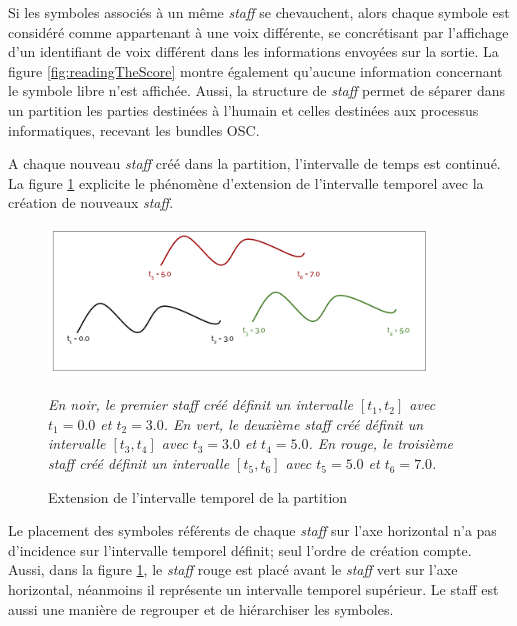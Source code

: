 Si les symboles associés à un même \textit{staff} se chevauchent, alors chaque symbole est considéré comme appartenant à une voix différente, se concrétisant par l'affichage d'un identifiant de voix différent dans les informations envoyées sur la sortie. La figure \ref{fig:readingTheScore} montre également qu'aucune information concernant le symbole libre n'est affichée. Aussi, la structure de \textit{staff} permet de séparer dans un partition les parties destinées à l'humain et celles destinées aux processus informatiques, recevant les bundles OSC.

A chaque nouveau \textit{staff} créé dans la partition, l'intervalle de temps est continué. La figure \ref{fig:stavesCreation} explicite le phénomène d'extension de l'intervalle temporel avec la création de nouveaux \textit{staff}.

\begin{figure}[H]
	\centering
	\includegraphics[keepaspectratio=true, width=0.9\textwidth]{ModeleDeNotation/i/stavesCreation.png}
	\caption{Extension de l'intervalle temporel de la partition}
	\label{fig:stavesCreation}
	\small
	\it
	En noir, le premier \emph{staff} créé définit un intervalle $[t_1, t_2]$ avec $t_1 = 0.0$ et $t_2 = 3.0$. En vert, le deuxième \emph{staff} créé définit un intervalle $[t_3, t_4]$ avec $t_3 = 3.0$ et $t_4 = 5.0$. En rouge, le troisième \emph{staff} créé définit un intervalle $[t_5, t_6]$ avec $t_5 = 5.0$ et $t_6 = 7.0$.
\end{figure}

Le placement des symboles référents de chaque \textit{staff} sur l'axe horizontal n'a pas d'incidence sur l'intervalle temporel définit; seul l'ordre de création compte. Aussi, dans la figure \ref{fig:stavesCreation}, le \textit{staff} rouge est placé avant le \textit{staff} vert sur l'axe horizontal, néanmoins il représente un intervalle temporel supérieur.
Le staff est aussi une manière de regrouper et de hiérarchiser les symboles. 
 

